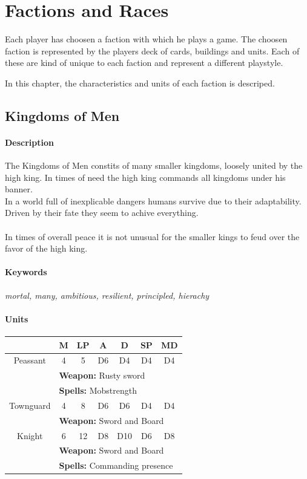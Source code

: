 \documentclass[a5paper,pagesize,10pt,bibtotoc,pointlessnumbers,
normalheadings,DIV=9,twoside=false]{scrbook}
\begin{document}
\chapter{Factions and Races}
Each player has choosen a faction with which he plays a game. The choosen faction is represented by the players deck of cards, buildings and units. Each of these are kind of unique to each faction and represent a different playstyle.

In this chapter, the characteristics and units of each faction is descriped.
\newpage
\section{Kingdoms of Men}

\subsubsection{Description}
The Kingdoms of Men constits of many smaller kingdoms, loosely united by the high king. In times of need the high king commands all kingdoms under his banner.\\
In a world full of inexplicable dangers humans survive due to their adaptability. Driven by their fate they seem to achive everything.\\
\\
In times of overall peace it is not unusual for the smaller kings to feud over the favor of the high king.

\subsubsection{Keywords}
\emph{mortal, many, ambitious, resilient, principled, hierachy}

\subsubsection{Units}
 \begin{tabular}{||c c c c c c c||} 
 \hline
  & M & LP & A & D & SP & MD \\
 \hline\hline
 Peassant & 4 & 5 & D6 & D4 & D4 & D4 \\ 
  & \multicolumn{6}{l||}{\textbf{Weapon:} Rusty sword} \\
  & \multicolumn{6}{l||}{\textbf{Spells:} Mobstrength} \\
 \hline
  Townguard & 4 & 8 & D6 & D6 & D4 & D4 \\ 
  & \multicolumn{6}{l||}{\textbf{Weapon:} Sword and Board} \\
 \hline
 Knight & 6  & 12 & D8 & D10 & D6 & D8 \\
  & \multicolumn{6}{l||}{\textbf{Weapon:} Sword and Board} \\
  & \multicolumn{6}{l||}{\textbf{Spells:} Commanding presence} \\
  \hline

\end{tabular}
\end{document}
